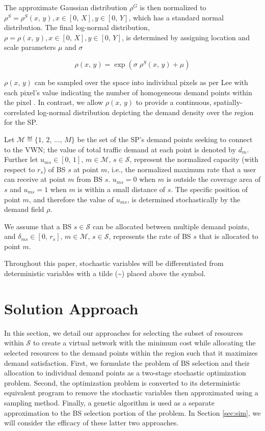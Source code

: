 \documentclass[onecolumn,draftcls]{IEEEtran}
\begin{document}
The approximate Gaussian distribution $\rho^G$ is then normalized to $\rho^S = \rho^S\left(x,\, y\right), x \in [0,\, X], y \in [0,\, Y]$, which has a standard normal distribution.  The final log-normal distribution, $\rho = \rho\left(x,\, y\right), x \in [0,\, X], y \in [0,\, Y]$, is determined by assigning location and scale parameters $\mu$ and $\sigma$

\begin{equation}
\rho\left(x,\, y\right) = \exp\left(\sigma \; \rho^S\left(x,\, y\right)+\mu\right)
\end{equation}

$\rho\left(x,\, y\right)$ can be sampled over the space into individual pixels as per Lee with each pixel's value indicating the number of homogeneous demand points within the pixel \cite{6554749}.  In contrast, we allow $\rho\left(x,\, y\right)$ to provide a continuous, spatially-correlated log-normal distribution depicting the demand density over the region for the SP.

Let $\mathcal{M} \eqdef \{1,\, 2,\, \ldots,\, M\}$ be the set of the SP's demand points seeking to connect to the VWN; the value of total traffic demand at each point is denoted by $d_m$.  Further let $u_{ms} \in [0,\, 1],\, m \in \mathcal{M},\, s \in \mathcal{S}$, represent the normalized capacity (with respect to $r_s$) of BS $s$ at point $m$, i.e., the normalized maximum rate that a user can receive at point $m$ from BS $s$.  $u_{ms} = 0$ when $m$ is outside the coverage area of $s$ and $u_{ms} = 1$ when $m$ is within a small distance of $s$.  The specific position of point $m$, and therefore the value of $u_{ms}$, is determined stochastically by the demand field $\rho$.

We assume that a BS $s \in \mathcal{S}$ can be allocated between multiple demand points, and $\delta_{ms} \in [0,\, r_s],\, m \in \mathcal{M},\, s \in \mathcal{S}$, represents the rate of BS $s$ that is allocated to point $m$.

Throughout this paper, stochastic variables will be differentiated from deterministic variables with a tilde (\textasciitilde) placed above the symbol.

\section{Solution Approach} \label{sec:approach}
In this section, we detail our approaches for selecting the subset of resources within $\mathcal{S}$ to create a virtual network with the minimum cost while allocating the selected resources to the demand points within the region such that it maximizes demand satisfaction.  First, we formulate the problem of BS selection and their allocation to individual demand points as a two-stage stochastic optimization problem.  Second, the optimization problem is converted to its deterministic equivalent program to remove the stochastic variables then approximated using a sampling method.  Finally, a genetic algorithm is used as a separate approximation to the BS selection portion of the problem.  In Section \ref{sec:sim}, we will consider the efficacy of these latter two approaches.
\end{document}
